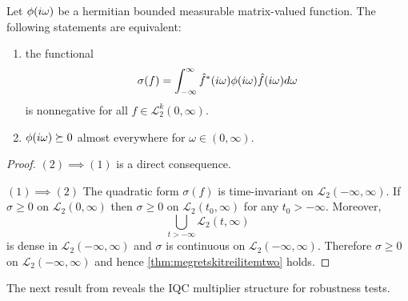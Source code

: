 \begin{thm}\label{thm:megretskitreil} Let $\phi(i\omega)$ be a hermitian bounded measurable matrix-valued function. 
The following statements are equivalent:
\begin{enumerate}
	\item the functional 
	\[
	\sigma(f) = \int_{-\infty}^\infty{\hat{f}^*(i\omega)\phi(i\omega)\hat{f}(i\omega)d\omega}
	\]
	is nonnegative for all $f\in\mathcal{L}_2^k(0,\infty)$. 
	\item\label{thm:megretskitreilitemtwo} $\phi(i\omega)\succeq 0$ almost everywhere for $\omega\in(0,\infty)$.
\end{enumerate}
\end{thm}
\begin{proof}\parbox{0pt}{}\par

$(2)\implies (1)$ is a direct consequence.


$(1)\implies (2)$ The quadratic form $\sigma(f)$ is time-invariant on $\mathcal{L}_2(-\infty,\infty)$. If 
	$\sigma\geq 0$ on $\mathcal{L}_2(0,\infty)$ then $\sigma\geq 0$ on $\mathcal{L}_2(t_0,\infty)$ for any $t_0>-\infty$.
	Moreover, 
	\[
	\bigcup\limits_{t>-\infty}\mathcal{L}_2(t,\infty)
	\]
	is dense in $\mathcal{L}_2(-\infty,\infty)$ and $\sigma$ is continuous on $\mathcal{L}_2(-\infty,\infty)$. Therefore
	$\sigma\geq 0$ on $\mathcal{L}_2(-\infty,\infty)$ and hence \cref{thm:megretskitreilitemtwo} holds.
\end{proof}

The next result from \cite{goh96} reveals the IQC multiplier structure for robustness tests. 

